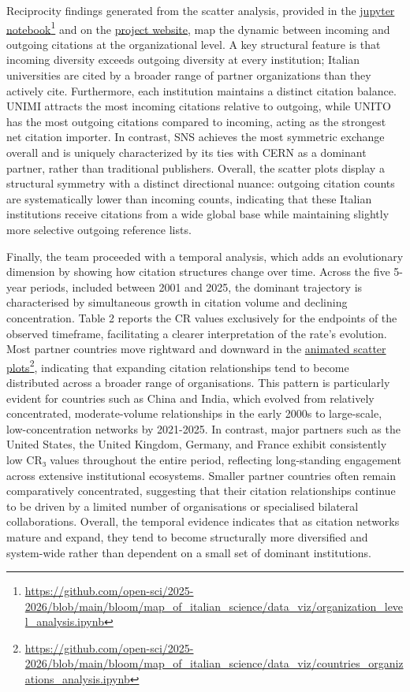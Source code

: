 \documentclass[year=2026]{cup-journal}
\begin{document}
Reciprocity findings generated from the scatter analysis, provided in the \href{https://github.com/open-sci/2025-2026/blob/main/bloom/map_of_italian_science/data_viz/organization_level_analysis.ipynb}{jupyter notebook}\footnote{\url{https://github.com/open-sci/2025-2026/blob/main/bloom/map_of_italian_science/data_viz/organization_level_analysis.ipynb}} and on the \href{https://open-sci.github.io/2025-2026/}{project website}, map the dynamic between incoming and outgoing citations at the organizational level. A key structural feature is that incoming diversity exceeds outgoing diversity at every institution; Italian universities are cited by a broader range of partner organizations than they actively cite. Furthermore, each institution maintains a distinct citation balance. UNIMI attracts the most incoming citations relative to outgoing, while UNITO has the most outgoing citations compared to incoming, acting as the strongest net citation importer. In contrast, SNS achieves the most symmetric exchange overall and is uniquely characterized by its ties with CERN as a dominant partner, rather than traditional publishers. Overall, the scatter plots display a structural symmetry with a distinct directional nuance: outgoing citation counts are systematically lower than incoming counts, indicating that these Italian institutions receive citations from a wide global base while maintaining slightly more selective outgoing reference lists.

Finally, the team proceeded with a temporal analysis, which adds an evolutionary dimension by showing how citation structures change over time. Across the five 5-year periods, included between 2001 and 2025, the dominant trajectory is characterised by simultaneous growth in citation volume and declining concentration. Table 2 reports the CR values exclusively for the endpoints of the observed timeframe, facilitating a clearer interpretation of the rate's evolution. Most partner countries move rightward and downward in the \href{https://github.com/open-sci/2025-2026/blob/main/bloom/map_of_italian_science/data_viz/countries_organizations_analysis.ipynb}{animated scatter plots}\footnote{\url{https://github.com/open-sci/2025-2026/blob/main/bloom/map_of_italian_science/data_viz/countries_organizations_analysis.ipynb}}, indicating that expanding citation relationships tend to become distributed across a broader range of organisations. This pattern is particularly evident for countries such as China and India, which evolved from relatively concentrated, moderate-volume relationships in the early 2000s to large-scale, low-concentration networks by 2021-2025. In contrast, major partners such as the United States, the United Kingdom, Germany, and France exhibit consistently low CR₃ values throughout the entire period, reflecting long-standing engagement across extensive institutional ecosystems. Smaller partner countries often remain comparatively concentrated, suggesting that their citation relationships continue to be driven by a limited number of organisations or specialised bilateral collaborations. Overall, the temporal evidence indicates that as citation networks mature and expand, they tend to become structurally more diversified and system-wide rather than dependent on a small set of dominant institutions.
\end{document}
